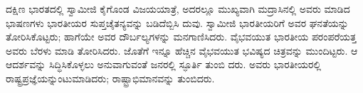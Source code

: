 ದಕ್ಷಿಣ ಭಾರತದಲ್ಲಿ ಸ್ವಾಮೀಜಿ ಕೈಗೊಂಡ ವಿಜಯಯಾತ್ರೆ, ಅದರಲ್ಲೂ ಮುಖ್ಯವಾಗಿ ಮದ್ರಾಸಿನಲ್ಲಿ ಅವರು ಮಾಡಿದ ಭಾಷಣಗಳು ಭಾರತೀಯರ ಸುಪ್ತಚೈತನ್ಯವನ್ನು ಬಡಿದೆಬ್ಬಿಸಿ ದುವು. ಸ್ವಾಮೀಜಿ ಭಾರತೀಯರಿಗೆ ಅವರ ಘನತೆಯನ್ನು ತೋರಿಸಿಕೊಟ್ಟರು; ಹಾಗೆಯೇ ಅವರ ದೌರ್ಬಲ್ಯಗಳನ್ನು ಮನಗಾಣಿಸಿದರು. ವೈಭವಯುತ ಭಾರತೀಯ ಪರಂಪರೆಯತ್ತ ಅವರು ಬೆರಳು ಮಾಡಿ ತೋರಿಸಿದರು. ಜೊತೆಗೆ ಇನ್ನೂ ಹೆಚ್ಚಿನ ವೈಭವಯುತ ಭವಿಷ್ಯದ ಚಿತ್ರವನ್ನು ಮುಂದಿಟ್ಟರು. ಆ ಆದರ್ಶವನ್ನು ಸಿದ್ಧಿಸಿಕೊಳ್ಳಲು ಅನುವಾಗುವಂತೆ ಜನರಲ್ಲಿ ಸ್ಫೂರ್ತಿ ತುಂಬಿ ದರು. ಅವರು ಭಾರತೀಯರಲ್ಲಿ ರಾಷ್ಟ್ರಪ್ರಜ್ಞೆಯನ್ನುಂಟುಮಾಡಿದರು; ರಾಷ್ಟ್ರಾಭಿಮಾನವನ್ನು ತುಂಬಿದರು.

